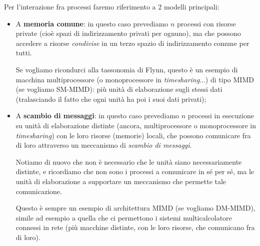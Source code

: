 \documentclass[a4paper,11pt]{article}
\begin{document}
Per l'interazione fra processi faremo riferimento a 2 modelli principali:
\begin{itemize}
	\item A \textbf{memoria comune}: in questo caso prevediamo $n$ processi con risorse private (cioè spazi di indirizzamento privati per ognuno), ma che possono accedere a risorse \textit{condivise} in un terzo spazio di indirizzamento comune per tutti. 

		Se vogliamo ricondurci alla tassonomia di Flynn, questo è un esempio di macchina multiprocessore (o monoprocessore in \textit{timesharing}...) di tipo MIMD (se vogliamo SM-MIMD): più unità di elaborazione sugli stessi dati (tralasciando il fatto che ogni unità ha poi i suoi dati privati);

	\item A \textbf{scambio di messaggi}: in questo caso prevediamo $n$ processi in esecuzione su unità di elaborazione distinte (ancora, multiprocessore o monoprocessore in \textit{timesharing}) con le loro risorse (memorie) locali, che possono comunicare fra di loro attraverso un meccanismo di \textit{scambio di messaggi}.

Notiamo di nuovo che non è necessario che le unità siano necessariamente distinte, e ricordiamo che non sono i processi a comunicare in sé per sé, ma le unità di elaborazione a supportare un meccanismo che permette tale comunicazione.

		Questo è sempre un esempio di architettura MIMD (se vogliamo DM-MIMD), simile ad esempio a quella che ci permettono i sistemi multicalcolatore connessi in rete (più macchine distinte, con le loro risorse, che comunicano fra di loro).
\end{itemize}
\end{document}

